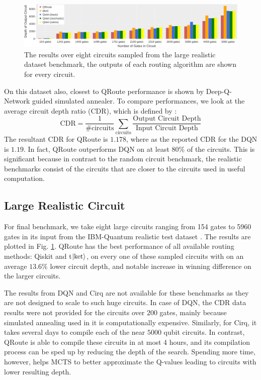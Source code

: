 \begin{figure}[ht]
    \centering
    \includegraphics[width=\linewidth]{figures/qroute/realistic_large_benchmark.pdf}
    \caption[qRoute Results on large realistic circuit set]{\label{fig:results-large}
        The results over eight circuits sampled from the large realistic dataset benchmark, the outputs of each routing algorithm are shown for every circuit.}
\end{figure}




On this dataset also, closest to QRoute performance is shown by Deep-Q-Network guided simulated annealer. To compare performances, we look at the average circuit depth ratio (CDR), which is defined by \cite{qroute_dqn2}:
\begin{equation}
    \text{CDR} = \frac{1}{\textrm{\#circuits}} \sum_{\textrm{circuits}} \frac{\textrm{Output Circuit Depth}}{\textrm{Input Circuit Depth}}
    \label{eq:CDR}
\end{equation}
The resultant CDR for QRoute is $1.178$, where as the reported CDR for the DQN is $1.19$. In fact, QRoute outperforms DQN on at least $80\%$ of the circuits. This is significant because in contrast to the random circuit benchmark, the realistic benchmarks consist of the circuits that are closer to the circuits used in useful computation.


\subsection{\label{sec:results-realistic}Large Realistic Circuit}

For final benchmark, we take eight large circuits ranging from 154 gates to 5960 gates in its input from the IBM-Quantum realistic test dataset \cite{data_realistic}. The results are plotted in Fig.  \ref{fig:results-large}. QRoute has the best performance of all available routing methods: Qiskit and t$\ket{\text{ket}}$, on every one of these sampled circuits with on an average $13.6\%$ lower circuit depth, and notable increase in winning difference on the larger circuits.



The results from DQN and Cirq are not available for these benchmarks as they are not designed to scale to such huge circuits. In case of DQN, the CDR data results were not provided for the circuits over $200$ gates, mainly because simulated annealing used in it is computationally expensive. Similarly, for Cirq, it takes several days to compile each of the near $5000$ qubit circuits. In contrast, QRoute is able to compile these circuits in at most 4 hours, and its compilation process can be sped up by reducing the depth of the search. Spending more time, however, helps MCTS to better approximate the Q-values leading to circuits with lower resulting depth.



